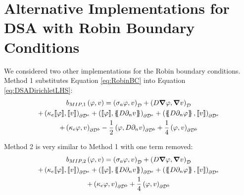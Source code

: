 \documentclass{article}
\begin{document}
\section{Alternative Implementations for DSA with Robin Boundary Conditions}
\label{sec:AltImpDSARobinBCs}
We considered two other implementations for the Robin boundary conditions. Method 1 substitutes Equation \ref{eq:RobinBC} into Equation \ref{eq:DSADirichletLHS}:
\begin{multline}
b_{MIP,1} \left( \varphi, v \right) = \left( \sigma_a \varphi, v \right)_\mathcal{D} + \left( D \grad \varphi, \grad v \right)_\mathcal{D} \\
+ \left( \kappa_e \llbracket \varphi \rrbracket, \llbracket v \rrbracket \right)_{\partial \mathcal{D}^e}
+ \left( \llbracket \varphi \rrbracket , \left\{\!\!\left\{ D \partial_n v \right\} \!\! \right\} \right)_{\partial \mathcal{D}^e} + \left( \left\{ \!\! \left\{ D \partial_n \varphi \right\} \!\! \right\} , \llbracket v \rrbracket \right)_{\partial \mathcal{D}^e} \\
+ \left(\kappa_e \varphi, v \right)_{\partial \mathcal{D}^b}
- \frac{1}{2} \left(\varphi, D \partial_n v \right)_{\partial \mathcal{D}^b}
+ \frac{1}{4} \left(\varphi, v \right)_{\partial \mathcal{D}^b}
\label{eq:Method1}
\end{multline}

Method 2 is very similar to Method 1 with one term removed:
\begin{multline}
b_{MIP,2} \left( \varphi, v \right) = \left( \sigma_a \varphi, v \right)_\mathcal{D} + \left( D \grad \varphi, \grad v \right)_\mathcal{D} \\
+ \left( \kappa_e \llbracket \varphi \rrbracket, \llbracket v \rrbracket \right)_{\partial \mathcal{D}^e}
+ \left( \llbracket \varphi \rrbracket , \left\{\!\!\left\{ D \partial_n v \right\} \!\! \right\} \right)_{\partial \mathcal{D}^e} + \left( \left\{ \!\! \left\{ D \partial_n \varphi \right\} \!\! \right\} , \llbracket v \rrbracket \right)_{\partial \mathcal{D}^e} \\
+ \left(\kappa_e \varphi, v \right)_{\partial \mathcal{D}^b}
+ \frac{1}{4} \left(\varphi, v \right)_{\partial \mathcal{D}^b}
\label{eq:Method2}
\end{multline}
\end{document}
